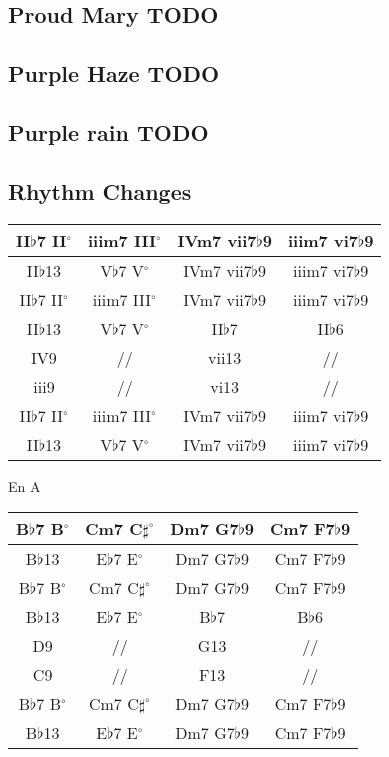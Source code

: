 \documentclass[a4paper,10pt]{article}
\begin{document}
\subsection{Proud Mary TODO}
\newpage

\subsection{Purple Haze TODO}
\newpage

\subsection{Purple rain TODO}
\newpage

\subsection{Rhythm Changes}

\begin{tabular}{ | c | c | c | c | } \hline			
	II$\flat$7 II$^{\circ}$ & iiim7 III$^{\circ}$ & IVm7 vii7$\flat$9 & iiim7 vi7$\flat$9 \\ \hline  
	II$\flat$13 & V$\flat$7 V$^{\circ}$ & IVm7 vii7$\flat$9 & iiim7 vi7$\flat$9 \\ \hline  \hline 
	II$\flat$7 II$^{\circ}$ & iiim7 III$^{\circ}$ & IVm7 vii7$\flat$9 & iiim7 vi7$\flat$9 \\ \hline  
	II$\flat$13 & V$\flat$7 V$^{\circ}$ & II$\flat$7 & II$\flat$6 \\ \hline  \hline
	IV9 & // & vii13 & // \\ \hline  
	iii9 & // & vi13 & // \\ \hline  \hline
	II$\flat$7 II$^{\circ}$ & iiim7 III$^{\circ}$ & IVm7 vii7$\flat$9 & iiim7 vi7$\flat$9 \\ \hline  
	II$\flat$13 & V$\flat$7 V$^{\circ}$ & IVm7 vii7$\flat$9 & iiim7 vi7$\flat$9 \\ \hline  
\end{tabular}
\newline
\newline

En A

\begin{tabular}{ | c | c | c | c | } \hline			
	B$\flat$7 B$^{\circ}$ & Cm7 C$\sharp^{\circ}$ & Dm7 G7$\flat$9 & Cm7 F7$\flat$9 \\ \hline  
	B$\flat$13 & E$\flat$7 E$^{\circ}$ & Dm7 G7$\flat$9 & Cm7 F7$\flat$9 \\ \hline  \hline 
	B$\flat$7 B$^{\circ}$ & Cm7 C$\sharp^{\circ}$ & Dm7 G7$\flat$9 & Cm7 F7$\flat$9 \\ \hline  
	B$\flat$13 & E$\flat$7 E$^{\circ}$ & B$\flat$7 & B$\flat$6 \\ \hline  \hline
	D9 & // & G13 & // \\ \hline  
	C9 & // & F13 & // \\ \hline  \hline
	B$\flat$7 B$^{\circ}$ & Cm7 C$\sharp^{\circ}$ & Dm7 G7$\flat$9 & Cm7 F7$\flat$9 \\ \hline  
	B$\flat$13 & E$\flat$7 E$^{\circ}$ & Dm7 G7$\flat$9 & Cm7 F7$\flat$9 \\ \hline  
\end{tabular}
\newpage
\end{document}
